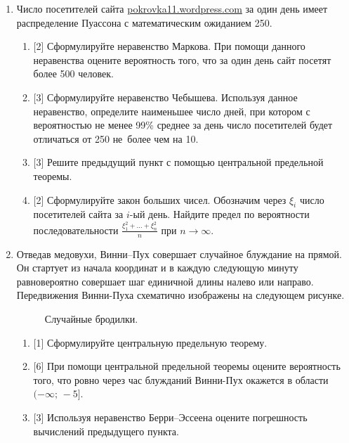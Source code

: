 \documentclass[12pt, a4paper]{article}\usepackage[]{graphicx}\usepackage[]{color}
\begin{document}
\begin{enumerate}
\newpage
\item Число посетителей сайта \url{pokrovka11.wordpress.com} за один день имеет распределение Пуассона с математическим ожиданием 250.
\begin{enumerate}
  \item{} [2] Сформулируйте неравенство Маркова. При помощи данного неравенства оцените вероятность того, что за один день сайт посетят более 500 человек.
  \item{} [3] Сформулируйте неравенство Чебышева. Используя данное неравенство, определите наименьшее число дней, при котором с вероятностью не менее 99\% среднее за день число посетителей будет отличаться от 250 не~более чем на 10.
  \item{} [3] Решите предыдущий пункт с помощью центральной предельной теоремы.
  \item{} [2] Сформулируйте закон больших чисел. Обозначим через $\xi_i$ число посетителей сайта за $i$-ый день. Найдите предел по вероятности последовательности $\frac{\xi_1^2 + \ldots + \xi_n^2}{n}$ при $n \rightarrow \infty$.
\end{enumerate}

\item Отведав медовухи, Винни–Пух совершает случайное блуждание на прямой. Он стартует из начала координат и в каждую следующую минуту равновероятно совершает шаг единичной длины налево или направо. Передвижения Винни-Пуха схематично изображены на следующем рисунке.
\begin{figure}[h]
    \noindent{}
    \caption{Случайные бродилки.}
    \label{wun762hkej}
\end{figure}
\begin{enumerate}
  \item{} [1] Сформулируйте центральную предельную теорему.
  \item{} [6] При помощи центральной предельной теоремы оцените вероятность того, что ровно через час блужданий Винни-Пух окажется в области $(-\infty; \, -5]$.
  \item{} [3] Используя неравенство Берри–Эссеена оцените погрешность вычислений предыдущего пункта.
\end{enumerate}



\end{enumerate}
\end{document}

